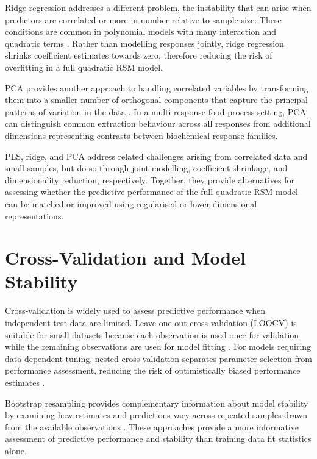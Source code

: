 \documentclass[MScDSA]{uccthesis}
\begin{document}
Ridge regression addresses a different problem, the instability that can arise when predictors are correlated or more in number relative to sample size. These conditions are common in polynomial models with many interaction and quadratic terms \parencite{Hoerl:1970,Hastie:2009}. Rather than modelling responses jointly, ridge regression shrinks coefficient estimates towards zero, therefore reducing the risk of overfitting in a full quadratic RSM model.

PCA provides another approach to  handling correlated variables by transforming them into a smaller number of orthogonal components that capture the principal patterns of variation in the data \parencite{Jolliffe:2002}. In a multi-response food-process setting, PCA can distinguish common extraction behaviour across all responses from additional dimensions representing contrasts between biochemical response families.

PLS, ridge, and PCA address related challenges arising from correlated data and small samples, but do so through joint modelling, coefficient shrinkage, and dimensionality reduction, respectively. Together, they provide alternatives for assessing whether the predictive performance of the full quadratic RSM model can be matched or improved using regularised or lower-dimensional representations.

\section{Cross-Validation and Model Stability}
\label{sec:cross_validation_and_model_stability}
Cross-validation is widely used to assess predictive performance when independent test data are limited. Leave-one-out cross-validation (LOOCV) is suitable for small datasets because each observation is used once for validation while the remaining observations are used for model fitting  \parencite{Stone:1974}. For models requiring data-dependent tuning, nested cross-validation separates parameter selection from performance assessment, reducing the risk of optimistically biased performance estimates \parencite{Varma:2006}.

Bootstrap resampling provides complementary information about model stability by examining how estimates and predictions vary across repeated samples drawn from the available observations \parencite{Efron:1979}. These approaches provide a more informative assessment of predictive performance and stability than training data fit statistics alone.
\end{document}
